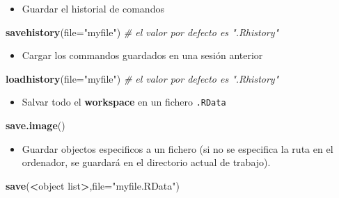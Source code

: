 \documentclass[]{book}
\newenvironment{Shaded}{\begin{snugshade}}{\end{snugshade}}
\newcommand{\KeywordTok}[1]{\textcolor[rgb]{0.13,0.29,0.53}{\textbf{#1}}}
\newcommand{\DataTypeTok}[1]{\textcolor[rgb]{0.13,0.29,0.53}{#1}}
\newcommand{\StringTok}[1]{\textcolor[rgb]{0.31,0.60,0.02}{#1}}
\newcommand{\CommentTok}[1]{\textcolor[rgb]{0.56,0.35,0.01}{\textit{#1}}}
\newcommand{\OperatorTok}[1]{\textcolor[rgb]{0.81,0.36,0.00}{\textbf{#1}}}
\newcommand{\NormalTok}[1]{#1}
\providecommand{\tightlist}{%
  \setlength{\itemsep}{0pt}\setlength{\parskip}{0pt}}
\begin{document}
\begin{itemize}
\tightlist
\item
  Guardar el historial de comandos
\end{itemize}

\begin{Shaded}
\begin{Highlighting}[]
\KeywordTok{savehistory}\NormalTok{(}\DataTypeTok{file=}\StringTok{"myfile"}\NormalTok{) }\CommentTok{# el valor por defecto es ".Rhistory"}
\end{Highlighting}
\end{Shaded}

\begin{itemize}
\tightlist
\item
  Cargar los commandos guardados en una sesión anterior
\end{itemize}

\begin{Shaded}
\begin{Highlighting}[]
\KeywordTok{loadhistory}\NormalTok{(}\DataTypeTok{file=}\StringTok{"myfile"}\NormalTok{) }\CommentTok{# el valor por defecto es ".Rhistory"}
\end{Highlighting}
\end{Shaded}

\begin{itemize}
\tightlist
\item
  Salvar todo el \textbf{workspace} en un fichero \texttt{.RData}
\end{itemize}

\begin{Shaded}
\begin{Highlighting}[]
\KeywordTok{save.image}\NormalTok{()}
\end{Highlighting}
\end{Shaded}

\begin{itemize}
\tightlist
\item
  Guardar objectos especificos a un fichero (si no se especifica la ruta
  en el ordenador, se guardará en el directorio actual de trabajo).
\end{itemize}

\begin{Shaded}
\begin{Highlighting}[]
\KeywordTok{save}\NormalTok{(}\OperatorTok{<}\NormalTok{object list}\OperatorTok{>}\NormalTok{,}\DataTypeTok{file=}\StringTok{"myfile.RData"}\NormalTok{) }
\end{Highlighting}
\end{Shaded}
\end{document}
